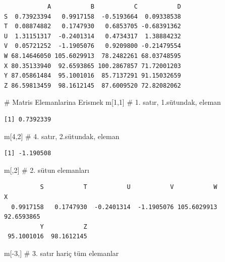 \documentclass[
  letterpaper,
  DIV=11,
  numbers=noendperiod]{scrreprt}
\newenvironment{Shaded}{\begin{snugshade}}{\end{snugshade}}
\newcommand{\CommentTok}[1]{\textcolor[rgb]{0.37,0.37,0.37}{#1}}
\newcommand{\DecValTok}[1]{\textcolor[rgb]{0.68,0.00,0.00}{#1}}
\newcommand{\NormalTok}[1]{\textcolor[rgb]{0.00,0.23,0.31}{#1}}
\newcommand{\SpecialCharTok}[1]{\textcolor[rgb]{0.37,0.37,0.37}{#1}}
\begin{document}
\begin{verbatim}
            A           B           C           D
S  0.73923394   0.9917158  -0.5193664  0.09338538
T  0.08874882   0.1747930   0.6853705 -0.68391362
U  1.31151317  -0.2401314   0.4734317  1.38884232
V  0.05721252  -1.1905076   0.9209800 -0.21479554
W 68.14646050 105.6029913  78.2482261 68.03748595
X 80.35133940  92.6593865 100.2867857 71.72001203
Y 87.05861484  95.1001016  85.7137291 91.15032659
Z 86.59813459  98.1612145  87.6009520 72.82082062
\end{verbatim}

\begin{Shaded}
\begin{Highlighting}[]
\CommentTok{\# Matris Elemanlarina Erismek}
\NormalTok{m[}\DecValTok{1}\NormalTok{,}\DecValTok{1}\NormalTok{] }\CommentTok{\# 1. satır, 1.sütundak, eleman}
\end{Highlighting}
\end{Shaded}

\begin{verbatim}
[1] 0.7392339
\end{verbatim}

\begin{Shaded}
\begin{Highlighting}[]
\NormalTok{m[}\DecValTok{4}\NormalTok{,}\DecValTok{2}\NormalTok{] }\CommentTok{\# 4. satır, 2.sütundak, eleman}
\end{Highlighting}
\end{Shaded}

\begin{verbatim}
[1] -1.190508
\end{verbatim}

\begin{Shaded}
\begin{Highlighting}[]
\NormalTok{m[,}\DecValTok{2}\NormalTok{] }\CommentTok{\# 2. sütun elemanları}
\end{Highlighting}
\end{Shaded}

\begin{verbatim}
          S           T           U           V           W           X 
  0.9917158   0.1747930  -0.2401314  -1.1905076 105.6029913  92.6593865 
          Y           Z 
 95.1001016  98.1612145 
\end{verbatim}

\begin{Shaded}
\begin{Highlighting}[]
\NormalTok{m[}\SpecialCharTok{{-}}\DecValTok{3}\NormalTok{,] }\CommentTok{\# 3. satır hariç tüm elemanlar}
\end{Highlighting}
\end{Shaded}
\end{document}
